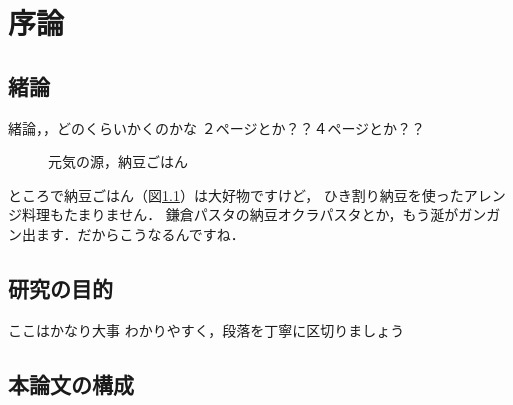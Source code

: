 \chapter{序論}


\section{緒論}
緒論，，どのくらいかくのかな
\clearpage
２ページとか？？４ページとか？？


\begin{figure}[tb]\centering
\epsfxsize=10cm
\caption{元気の源，納豆ごはん}\label{fig:nattorice}
\end{figure}

ところで納豆ごはん（図\ref{fig:nattorice}）は大好物ですけど，
ひき割り納豆を使ったアレンジ料理もたまりません．
鎌倉パスタの納豆オクラパスタとか，もう涎がガンガン出ます．だからこうなるんですね．

\section{研究の目的}
ここはかなり大事
\clearpage
わかりやすく，段落を丁寧に区切りましょう

\section{本論文の構成}
